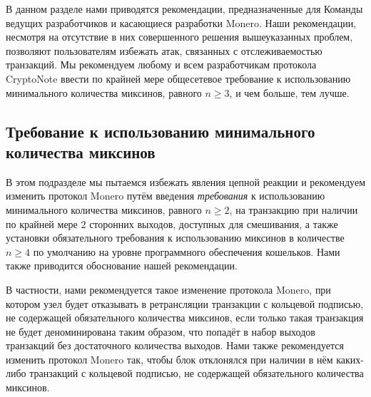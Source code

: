 \documentclass{mrl}
\begin{document}
В данном разделе нами приводятся рекомендации, предназначенные для Команды ведущих разработчиков и касающиеся разработки Monero. Наши рекомендации, несмотря на отсутствие в них совершенного решения вышеуказанных проблем, позволяют пользователям избежать атак, связанных с отслеживаемостью транзакций. Мы рекомендуем любому и всем разработчикам протокола CryptoNote ввести по крайней мере общесетевое требование к использованию минимального количества миксинов, равного $n\geq 3$, и чем больше, тем лучше.

\subsection{Требование к использованию минимального количества миксинов}\label{minMixIn}

В этом подразделе мы пытаемся избежать явления цепной реакции и рекомендуем изменить протокол Monero путём введения \textit{требования} к использованию минимального количества миксинов, равного $n\geq 2$, на транзакцию при наличии по крайней мере $2$ сторонних выходов, доступных для смешивания, а также установки обязательного требования к использованию миксинов в количестве $n\geq 4$ по умолчанию на уровне программного обеспечения кошельков. Нами также приводится обоснование нашей рекомендации.

В частности, нами рекомендуется такое изменение протокола Monero, при котором узел будет отказывать в ретрансляции транзакции с кольцевой подписью, не содержащей обязательного количества миксинов, если только такая транзакция не будет деноминирована таким образом, что попадёт в набор выходов транзакций без достаточного количества выходов. Нами также рекомендуется изменить протокол Monero так, чтобы блок отклонялся при наличии в нём каких-либо транзакций с кольцевой подписью, не содержащей обязательного количества миксинов.
\end{document}
